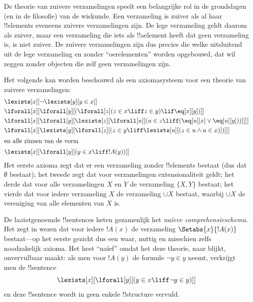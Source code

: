 \documentclass[openany]{memoir}
\begin{document}
\begin{ex}
De theorie van zuivere verzamelingen speelt een belangrijke rol in de
grondslagen (en in de filosofie) van de wiskunde. Een verzameling is
zuiver als al haar !!{element}s eveneens zuivere verzamelingen zijn.
De lege verzameling geldt daarom als zuiver, maar een verzameling die
iets als !!a{element} heeft dat geen verzameling is, is niet zuiver.
De zuivere verzamelingen zijn dus precies die welke uitsluitend uit de
lege verzameling en zonder ``oerelementen'' worden opgebouwd, dat wil
zeggen zonder objecten die zelf geen verzamelingen zijn.

Het volgende kan worden beschouwd als een axiomasysteem voor een
theorie van zuivere verzamelingen:
\begin{align*}
& \lexists[x][\lnot \lexists[y][y \in x]]\\
& \lforall[x][\lforall[y][(\lforall[z](z \in x \liff z \in y) \lif 
\eq[x][y])]]\\
& \lforall[x][\lforall[y][\lexists[z][\lforall[u][(u \in z \liff
(\eq[u][x] \lor \eq[u][y]))]]]]\\
& \lforall[x][\lexists[y][\lforall[z][(z \in y \liff \lexists[u][(z \in
        u \land u \in x)])]]]\\
\intertext{en alle zinnen van de vorm} &
\lexists[x][\lforall[y][(y \in x \liff !A(y))]]
\end{align*}
Het eerste axioma zegt dat er een verzameling zonder !!{element}s
bestaat (dus dat $\emptyset$ bestaat); het tweede zegt dat voor
verzamelingen extensionaliteit geldt; het derde dat voor alle
verzamelingen $X$ en $Y$ de verzameling $\{X, Y\}$ bestaat; het vierde
dat voor iedere verzameling $X$ de verzameling $\cup X$ bestaat,
waarbij $\cup X$ de vereniging van alle elementen van $X$ is.

De laatstgenoemde !!{sentence}s heten gezamenlijk het
\emph{naïeve comprehensieschema}. Het zegt in wezen dat voor iedere
$!A(x)$ de verzameling $\Setabs{x}{!A(x)}$ bestaat---op het eerste
gezicht dus een waar, nuttig en misschien zelfs noodzakelijk axioma.
Het heet ``naïef'' omdat het deze theorie, naar blijkt, onvervulbaar
maakt: als men voor $!A(y)$ de formule $\lnot y \in y$ neemt, verkrijgt
men de !!{sentence}
\[
\lexists[x][\lforall[y][(y \in x \liff \lnot y \in y)]]
\]
en deze !!{sentence} wordt in geen enkele !!{structure} vervuld.
\end{ex}
\end{document}
